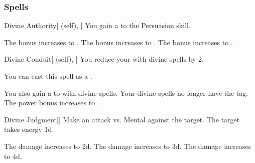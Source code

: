 \subsubsection{Spells}


\lowercase{\hypertarget{spell:Divine Authority}{}}\label{spell:Divine Authority}
\begin{attuneability}[Rank 1]{\hypertarget{spell:Divine Authority}{Divine Authority}}[ (self), ]
You gain a   to the Persuasion skill.

\rankline
{} The bonus increases to .
 The bonus increases to .
 The bonus increases to .
\end{attuneability}
\vspace{0.25em}



\lowercase{\hypertarget{spell:Divine Conduit}{}}\label{spell:Divine Conduit}
\begin{attuneability}[Rank 1]{\hypertarget{spell:Divine Conduit}{Divine Conduit}}[ (self), ]
You reduce your  with divine spells by 2.

You can cast this spell as a .

\rankline
{} You also gain a   to  with divine spells.
 Your divine spells no longer have the  tag.
 The power bonus increases to .
\end{attuneability}
\vspace{0.25em}



\lowercase{\hypertarget{spell:Divine Judgment}{}}\label{spell:Divine Judgment}
\begin{freeability}[Rank 1]{\hypertarget{spell:Divine Judgment}{Divine Judgment}}[]
Make an attack vs. Mental against the target.
\hit The target takes energy  \plus1d.

\rankline
{} The damage increases to  \plus2d.
 The damage increases to  \plus3d.
 The damage increases to  \plus4d.
\end{freeability}
\vspace{0.25em}



